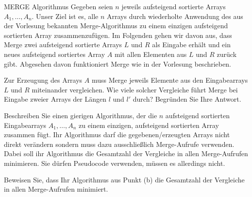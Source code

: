 \documentclass{article}
\begin{document}
\begin{eexercises}{MERGE Algorithmus}{
    Gegeben seien $n$ jeweils aufsteigend sortierte Arrays $A_1, \ldots, A_n$. Unser Ziel ist es, alle $n$ Arrays durch wiederholte Anwendung des aus der Vorlesung bekannten Merge-Algorithmus zu einem einzigen aufsteigend sortierten Array zusammenzufügen. Im Folgenden gehen wir davon aus, dass Merge zwei aufsteigend sortierte Arrays $L$ und $R$ als Eingabe erhält und ein neues aufsteigend sortiertes Array $A$ mit allen Elementen aus $L$ und $R$ zurück gibt. Abgesehen davon funktioniert Merge wie in der Vorlesung beschrieben.
  }
  \item Zur Erzeugung des Arrays $A$ muss Merge jeweils Elemente aus den Eingabearrays $L$ und $R$ miteinander vergleichen. Wie viele solcher Vergleiche führt Merge bei Eingabe zweier Arrays der Längen $l$ und $l'$ durch? Begründen Sie Ihre Antwort.
  \item Beschreiben Sie einen gierigen Algorithmus, der die $n$ aufsteigend sortierten Eingabearrays $A_1, \ldots, A_n$ zu einem einzigen, aufsteigend sortierten Array zusammen fügt. Ihr Algorithmus darf die gegebenen/erzeugten Arrays nicht direkt verändern sondern muss dazu ausschließlich Merge-Aufrufe verwenden. Dabei soll ihr Algorithmus die Gesamtzahl der Vergleiche in allen Merge-Aufrufen minimieren. Sie dürfen Pseudocode verwenden, müssen es allerdings nicht.
  \item Beweisen Sie, dass Ihr Algorithmus aus Punkt (b) die Gesamtzahl der Vergleiche in allen Merge-Aufrufen minimiert.
\end{eexercises}
\end{document}
